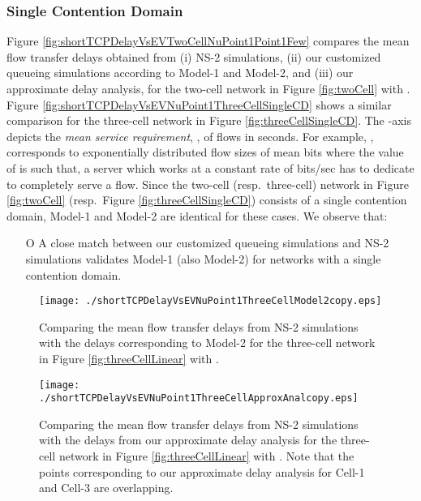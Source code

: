 \documentclass[10pt,a4paper,journal]{IEEEtran}
\theoremstyle{definition}
\theoremstyle{remark}
\theoremstyle{plain}
\begin{document}
\subsubsection{Single Contention Domain}
\label{subsubsec:single-contention-domain}

Figure \ref{fig:shortTCPDelayVsEVTwoCellNuPoint1Point1Few} compares
the mean flow transfer delays obtained from (i) NS-2 simulations, (ii)
our customized queueing simulations according to Model-1 and Model-2, and
(iii) our approximate delay analysis, for the two-cell network in
Figure \ref{fig:twoCell} with . Figure \ref{fig:shortTCPDelayVsEVNuPoint1ThreeCellSingleCD}
shows a similar comparison for the three-cell network in Figure
\ref{fig:threeCellSingleCD}. The -axis depicts the \textit{mean
  service requirement}, , of flows in
seconds. For example, ,
corresponds to exponentially distributed flow sizes of mean 
bits where the value of  is such that, a server which works
at a constant rate of  bits/sec has to dedicate  to
completely serve a flow. Since the two-cell (resp.~three-cell) network
in Figure \ref{fig:twoCell} (resp.~Figure \ref{fig:threeCellSingleCD})
consists of a single contention domain, Model-1 and Model-2 are
identical for these cases. We observe that: 
\begin{itemize}

\item [O] A close match between our customized queueing simulations 
and NS-2 simulations validates Model-1 (also Model-2) for networks with 
a single contention domain.  

\end{itemize}



\begin{figure}[tb]
  \centering
  \begin{minipage}{8.25cm}
    \begin{center}
      \texttt{[image: ./shortTCPDelayVsEVNuPoint1ThreeCellModel2copy.eps]}
     \caption{Comparing the mean flow transfer delays from
       NS-2 simulations with the delays corresponding to Model-2 for
       the three-cell network in Figure \ref{fig:threeCellLinear}
       with . \label{fig:shortTCPDelayVsEVNuPoint1ThreeCellLinearModel2}}
     \vspace{2mm}
    \end{center}
  \end{minipage}
\begin{minipage}{8.25cm}
    \begin{center}
      \texttt{[image: ./shortTCPDelayVsEVNuPoint1ThreeCellApproxAnalcopy.eps]}
     \caption{Comparing the mean flow transfer delays from
       NS-2 simulations with the delays from our approximate delay
       analysis for the three-cell network in Figure
       \ref{fig:threeCellLinear} with . Note that the points corresponding to our
       approximate delay analysis for Cell-1 and Cell-3 are
       overlapping. \label{fig:shortTCPDelayVsEVNuPoint1ThreeCellLinearApproxAnal}}
    \end{center}
  \end{minipage}
\end{figure}
\end{document}
